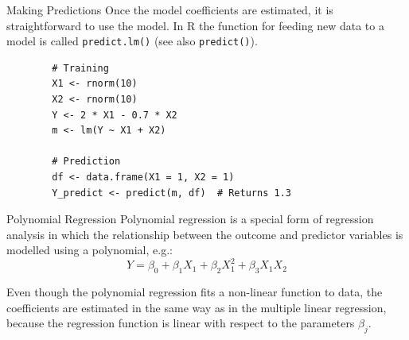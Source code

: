 \begin{frame}[fragile]{Making Predictions}
    Once the model coefficients are estimated, it is straightforward to use the model.
    In R the function for feeding new data to a model is called {\small\texttt{predict.lm()}}
    (see also {\small\texttt{predict()}}).

    \begin{verbatim}
        # Training
        X1 <- rnorm(10)
        X2 <- rnorm(10)
        Y <- 2 * X1 - 0.7 * X2
        m <- lm(Y ~ X1 + X2)

        # Prediction
        df <- data.frame(X1 = 1, X2 = 1)
        Y_predict <- predict(m, df)  # Returns 1.3
    \end{verbatim}
\end{frame}

\begin{frame}{Polynomial Regression}
    Polynomial regression is a special form of regression analysis in which the relationship
    between the outcome and predictor variables is modelled using a polynomial, e.g.:
    \begin{equation*}
        Y = \beta_0 + \beta_1 X_1 + \beta_2 X_1^2 + \beta_3 X_1 X_2
    \end{equation*}

    Even though the polynomial regression fits a non-linear function to data,
    the coefficients are estimated in the same way as in the multiple linear
    regression, because the regression function is linear with respect to the
    parameters $\beta_j$.
\end{frame}

